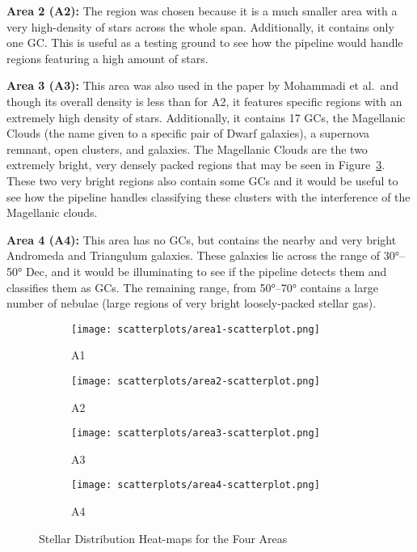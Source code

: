 \textbf{Area 2 (A2):}
The region was chosen because it is a much smaller area with a very high-density
of stars across the whole span. Additionally, it contains only one GC. This is
useful as a testing ground to see how the pipeline would handle regions
featuring a high amount of stars.

\textbf{Area 3 (A3):}
This area was also used in the paper by Mohammadi et al.\ and though its overall
density is less than for A2, it features specific regions with an extremely
high density of stars. Additionally, it contains 17 GCs, the Magellanic Clouds
(the name given to a specific pair of Dwarf galaxies), a supernova remnant, open
clusters, and galaxies. The Magellanic Clouds are the two extremely bright, very
densely packed regions that may be seen in Figure~\ref{fig:area3-scatter}. These
two very bright regions also contain some GCs and it would be useful to see
how the pipeline handles classifying these clusters with the interference of the
Magellanic clouds.

\textbf{Area 4 (A4):}
This area has no GCs, but contains the nearby and very bright Andromeda and Triangulum galaxies. These galaxies lie across the range of \ang{30}--\ang{50} Dec, and it would be illuminating to see if the pipeline detects them and classifies them as GCs. The remaining range, from \ang{50}--\ang{70} contains a large number of nebulae (large regions of very bright loosely-packed stellar gas).

\begin{figure}[H]
    \centering
    \begin{subfigure}[b]{0.49\textwidth}
        \texttt{[image: scatterplots/area1-scatterplot.png]}
        \caption{A1}
        \label{fig:area1-scatter}
    \end{subfigure}
    \begin{subfigure}[b]{0.49\textwidth}
        \texttt{[image: scatterplots/area2-scatterplot.png]}
        \caption{A2}
        \label{fig:area2-scatter}
    \end{subfigure}
    \begin{subfigure}[b]{0.49\textwidth}
        \texttt{[image: scatterplots/area3-scatterplot.png]}
        \caption{A3}
        \label{fig:area3-scatter}
    \end{subfigure}
    \begin{subfigure}[b]{0.49\textwidth}
        \texttt{[image: scatterplots/area4-scatterplot.png]}
        \caption{A4}
        \label{fig:area4-scatter}
    \end{subfigure}
    \caption{Stellar Distribution Heat-maps for the Four Areas}
    \label{fig:area-scatter}
\end{figure}

